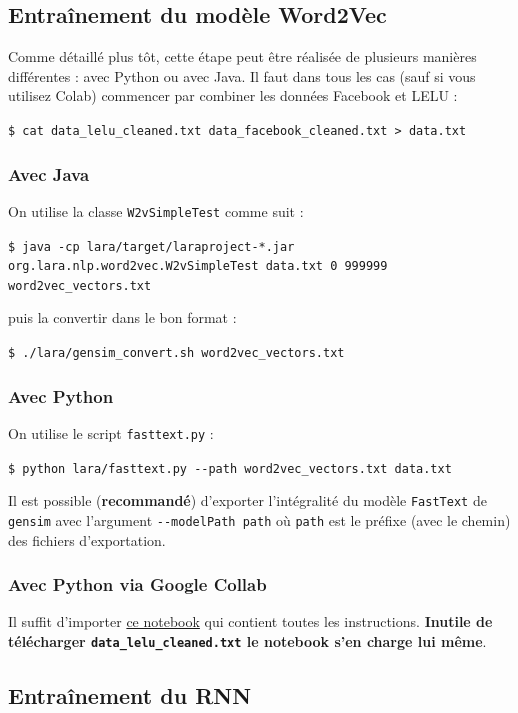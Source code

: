 \documentclass[10pt,a4paper]{article}
\begin{document}
\subsection{Entraînement du modèle Word2Vec}
Comme détaillé plus tôt, cette étape peut être réalisée de plusieurs manières différentes : avec Python ou avec Java. Il faut dans tous les cas (sauf si vous utilisez Colab) commencer par combiner les données Facebook et LELU :
\begin{center}
	\texttt{\$ cat data\_lelu\_cleaned.txt data\_facebook\_cleaned.txt > data.txt}
\end{center}

\subsubsection{Avec Java}
On utilise la classe \texttt{W2vSimpleTest} comme suit :
\begin{center}
	\texttt{\$ java -cp lara/target/laraproject-*.jar org.lara.nlp.word2vec.W2vSimpleTest data.txt 0 999999 word2vec\_vectors.txt}
\end{center}
puis la convertir dans le bon format :
\begin{center}
	\texttt{\$ ./lara/gensim\_convert.sh word2vec\_vectors.txt}
\end{center}

\subsubsection{Avec Python}
On utilise le script \texttt{fasttext.py} :
\begin{center}
	\texttt{\$ python lara/fasttext.py -{}-path word2vec\_vectors.txt data.txt}
\end{center}
Il est possible (\textbf{recommandé}) d'exporter l’intégralité du modèle \texttt{FastText} de \texttt{gensim} avec l'argument \texttt{-{}-modelPath path} où \texttt{path} est le préfixe (avec le chemin) des fichiers d'exportation.

\subsubsection{Avec Python via Google Collab}
Il suffit d'importer \href{https://github.com/LaraProject/notebooks/blob/master/LaraProject_Word2Vec.ipynb}{ce notebook} qui contient toutes les instructions. \textbf{Inutile de télécharger \texttt{data\_lelu\_cleaned.txt} le notebook s'en charge lui même}.

\subsection{Entraînement du RNN}
\end{document}
